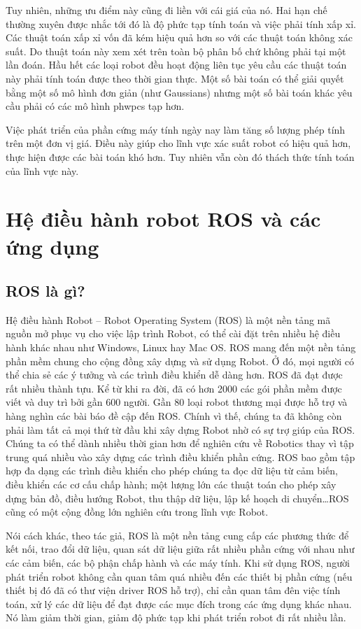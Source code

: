 Tuy nhiên, những ưu điểm này cũng đi liền với cái giá của nó. Hai hạn chế thường xuyên được nhắc tới đó là độ phức tạp tính toán và việc phải tính xấp xỉ. Các thuật toán xấp xỉ vốn đã kém hiệu quả hơn so với các thuật toán không xác suất. Do thuật toán này xem xét trên toàn bộ phân bố chứ không phải tại một lần đoán. Hầu hết các loại robot đều hoạt động liên tục yêu cầu các thuật toán này phải tính toán được theo thời gian thực. Một số bài toán có thể giải quyết bằng một số mô hình đơn giản (như Gaussians) nhưng một số bài toán khác yêu cầu phải có các mô hình phwpcs tạp hơn.

Việc phát triển của phần cứng máy tính ngày nay làm tăng số lượng phép tính trên một đơn vị giá. Điều này giúp cho lĩnh vực xác suất robot có hiệu quả hơn, thực hiện được các bài toán khó hơn. Tuy nhiên vẫn còn đó thách thức tính toán của lĩnh vực này. \cite{thrun2005probabilistic}


\section{Hệ điều hành robot ROS và các ứng dụng}
\subsection{ROS là gì?}
Hệ điều hành Robot – Robot Operating System (ROS) là một nền tảng mã nguồn
mở phục vụ cho việc lập trình Robot, có thể cài đặt trên nhiều hệ điều hành khác
nhau như Windows, Linux hay Mac OS. ROS mang đến một nền tảng phần mềm
chung cho cộng đồng xây dựng và sử dụng Robot. Ở đó, mọi người có thể chia sẻ
các ý tưởng và các trình điều khiển dễ dàng hơn.
ROS đã đạt được rất nhiều thành tựu. Kể từ khi ra đời, đã có hơn 2000 các gói
phần mềm được viết và duy trì bởi gần 600 người. Gần 80 loại robot thương mại
được hỗ trợ và hàng nghìn các bài báo đề cập đến ROS. Chính vì thế, chúng ta đã
không còn phải làm tất cả mọi thứ từ đầu khi xây dựng Robot nhờ có sự trợ giúp
của ROS. Chúng ta có thể dành nhiều thời gian hơn để nghiên cứu về Robotics
thay vì tập trung quá nhiều vào xây dựng các trình điều khiển phần cứng.
ROS bao gồm tập hợp đa dạng các trình điều khiển cho phép chúng ta đọc dữ
liệu từ cảm biến, điều khiển các cơ cấu chấp hành; một lượng lớn các thuật toán
cho phép xây dựng bản đồ, điều hướng Robot, thu thập dữ liệu, lập kế hoạch di
chuyển\dots ROS cũng có một cộng đồng lớn nghiên cứu trong lĩnh vực Robot.

Nói cách khác, theo tác giả, ROS là một nền tảng cung cấp các phương thức để kết nối, trao đổi dữ liệu, quan sát dữ liệu giữa rất nhiều phần cứng với nhau như các cảm biến, các bộ phận chấp hành và các máy tính. Khi sử dụng ROS, người phát triển robot không cần quan tâm quá nhiều đến các thiết bị phần cứng (nếu thiết bị đó đã có thư viện driver ROS hỗ trợ), chỉ cần quan tâm đên việc tính toán, xử lý các dữ liệu để đạt được các mục đích trong các ứng dụng khác nhau. Nó làm giảm thời gian, giảm độ phức tạp khi phát triển robot đi rất nhiều lần.


